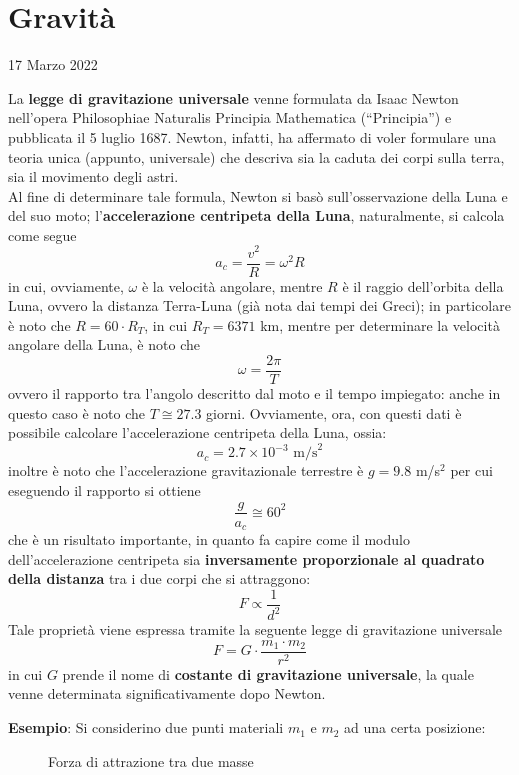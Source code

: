 \documentclass[a4paper]{extarticle}
\newcommand{\quotes}[1]{``#1''}
\begin{document}
\newpage
\section{Gravità}
\noindent
\begin{center}
  17 Marzo 2022
\end{center}
La \textbf{legge di gravitazione universale} venne formulata da Isaac Newton nell'opera Philosophiae Naturalis Principia Mathematica (\quotes{Principia}) e pubblicata il 5 luglio 1687. Newton, infatti, ha affermato di voler formulare una teoria unica (appunto, universale) che descriva sia la caduta dei corpi sulla terra, sia il movimento degli astri.\\
Al fine di determinare tale formula, Newton si basò sull'osservazione della Luna e del suo moto; l'\textbf{accelerazione centripeta della Luna}, naturalmente, si calcola come segue
\[a_c = \frac{v^2}{R} = \omega^2 R\]
in cui, ovviamente, $\omega$ è la velocità angolare, mentre $R$ è il raggio dell'orbita della Luna, ovvero la distanza Terra-Luna (già nota dai tempi dei Greci); in particolare è noto che $R = 60 \cdot R_T$, in cui $R_T = 6371$ km, mentre per determinare la velocità angolare della Luna, è noto che
\[\omega = \frac{2\pi}{T}\]
ovvero il rapporto tra l'angolo descritto dal moto e il tempo impiegato: anche in questo caso è noto che $T \cong 27.3$ giorni. Ovviamente, ora, con questi dati è possibile calcolare l'accelerazione centripeta della Luna, ossia:
\[a_c = 2.7 \times 10^{-3} \text{ m/s}^2\]
inoltre è noto che l'accelerazione gravitazionale terrestre è $g=9.8$ m/s$^2$ per cui eseguendo il rapporto si ottiene
\[\frac{g}{a_c} \cong 60^2\]
che è un risultato importante, in quanto fa capire come il modulo dell'accelerazione centripeta sia \textbf{inversamente proporzionale al quadrato della distanza} tra i due corpi che si attraggono:
\[F \propto \frac{1}{d^2}\]
Tale proprietà viene espressa tramite la seguente legge di gravitazione universale
\[\boxed{F = G \cdot \frac{m_1 \cdot m_2}{r^2}}\]
in cui $G$ prende il nome di \textbf{costante di gravitazione universale}, la quale venne determinata significativamente dopo Newton.

\vspace{2em}
\noindent
\textbf{Esempio}: Si considerino due punti materiali $m_1$ e $m_2$ ad una certa posizione:

\vspace{1em}
\begin{figure}[H]
  \centering
  \caption{Forza di attrazione tra due masse}
  \label{fig:forza_attrazione_gravitazionale}
\end{figure}
\end{document}

